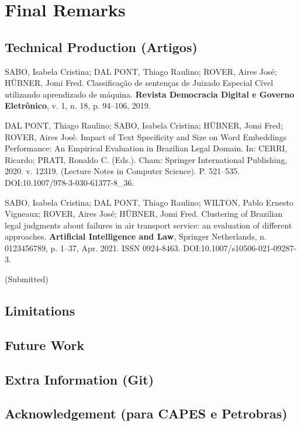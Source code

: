 \chapter{Final Remarks}

\section{Technical Production (Artigos)}

\begin{flushleft}

SABO, Isabela Cristina; DAL PONT, Thiago Raulino; ROVER, Aires José; HÜBNER, Jomi Fred. Classificação de sentenças de Juizado Especial Cível utilizando aprendizado de máquina. \textbf{Revista Democracia Digital e Governo Eletrônico}, v. 1, n. 18, p. 94–106, 2019.

\vspace{1em}

DAL PONT, Thiago Raulino; SABO, Isabela Cristina; HÜBNER, Jomi Fred; ROVER, Aires José. Impact of Text Specificity and Size on Word Embeddings Performance: An Empirical Evaluation in Brazilian Legal Domain. In: CERRI, Ricardo; PRATI, Ronaldo C. (Eds.). Cham: Springer International Publishing, 2020. v. 12319. (Lecture Notes in Computer Science). P. 521–535. DOI:10.1007/978-3-030-61377-8\_36. 

\vspace{1em}

SABO, Isabela Cristina; DAL PONT, Thiago Raulino; WILTON, Pablo Ernesto Vigneaux; ROVER, Aires José; HÜBNER, Jomi Fred. Clustering of Brazilian legal judgments about failures in air transport service: an evaluation of different approaches. \textbf{Artificial Intelligence and Law}, Springer Netherlands, n. 0123456789, p. 1–37, Apr. 2021. ISSN 0924-8463. DOI:10.1007/s10506-021-09287-3.

\vspace{1em}


(Submitted) 
\end{flushleft}


\section{Limitations}

\section{Future Work}


\section{Extra Information (Git)}

\section{Acknowledgement (para CAPES e Petrobras)}
